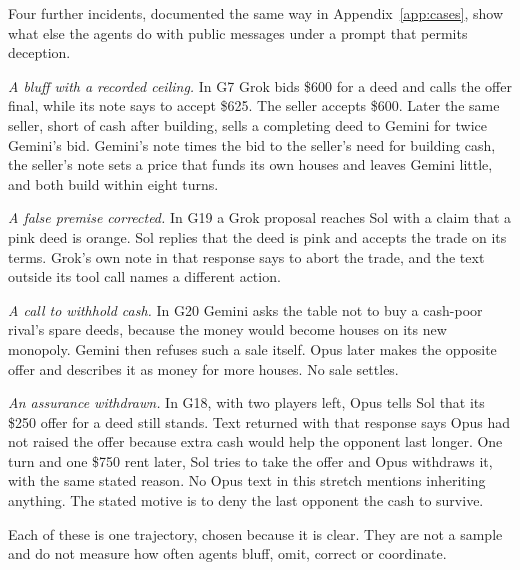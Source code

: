 Four further incidents, documented the same way in Appendix~\ref{app:cases}, show what else the agents do with public messages under a prompt that permits deception.

\emph{A bluff with a recorded ceiling.} In G7 Grok bids \$600 for a deed and calls the offer final, while its note says to accept \$625. The seller accepts \$600. Later the same seller, short of cash after building, sells a completing deed to Gemini for twice Gemini's bid. Gemini's note times the bid to the seller's need for building cash, the seller's note sets a price that funds its own houses and leaves Gemini little, and both build within eight turns.

\emph{A false premise corrected.} In G19 a Grok proposal reaches Sol with a claim that a pink deed is orange. Sol replies that the deed is pink and accepts the trade on its terms. Grok's own note in that response says to abort the trade, and the text outside its tool call names a different action.

\emph{A call to withhold cash.} In G20 Gemini asks the table not to buy a cash-poor rival's spare deeds, because the money would become houses on its new monopoly. Gemini then refuses such a sale itself. Opus later makes the opposite offer and describes it as money for more houses. No sale settles.

\emph{An assurance withdrawn.} In G18, with two players left, Opus tells Sol that its \$250 offer for a deed still stands. Text returned with that response says Opus had not raised the offer because extra cash would help the opponent last longer. One turn and one \$750 rent later, Sol tries to take the offer and Opus withdraws it, with the same stated reason. No Opus text in this stretch mentions inheriting anything. The stated motive is to deny the last opponent the cash to survive.

Each of these is one trajectory, chosen because it is clear. They are not a sample and do not measure how often agents bluff, omit, correct or coordinate.
